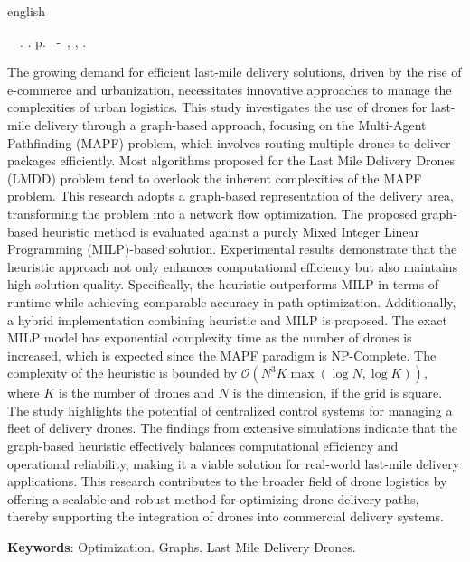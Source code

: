 \begin{resumo}[Abstract]
\begin{otherlanguage*}{english}
	\begin{flushleft} 
			\setlength{\absparsep}{0pt} %
			\SingleSpacing 
			\imprimirautorabr~~\textbf{\imprimirtituloresumo}.	\imprimirdata. \pageref{LastPage}p. 
			\imprimirtipotrabalho~-~\imprimirinstituicao, \imprimirlocal, \imprimirdata. 
 	\end{flushleft}
\OnehalfSpacing
	
The growing demand for efficient last-mile delivery solutions, driven by the rise of e-commerce and urbanization, necessitates innovative approaches to manage the complexities of urban logistics. This study investigates the use of drones for last-mile delivery through a graph-based approach, focusing on the Multi-Agent Pathfinding (MAPF) problem, which involves routing multiple drones to deliver packages efficiently. Most algorithms proposed for the Last Mile Delivery Drones (LMDD) problem tend to overlook the inherent complexities of the MAPF problem. This research adopts a graph-based representation of the delivery area, transforming the problem into a network flow optimization. The proposed graph-based heuristic method is evaluated against a purely Mixed Integer Linear Programming (MILP)-based solution. Experimental results demonstrate that the heuristic approach not only enhances computational efficiency but also maintains high solution quality. Specifically, the heuristic outperforms MILP in terms of runtime while achieving comparable accuracy in path optimization. Additionally, a hybrid implementation combining heuristic and MILP is proposed. The exact MILP model has exponential complexity time as the number of drones is increased, which is expected since the MAPF paradigm is NP-Complete. The complexity of the heuristic is bounded by \(\mathcal{O}(N^3 K \max{(\log N, \log K)})\), where $K$ is the number of drones and $N$ is the dimension, if the grid is square. The study highlights the potential of centralized control systems for managing a fleet of delivery drones. The findings from extensive simulations indicate that the graph-based heuristic effectively balances computational efficiency and operational reliability, making it a viable solution for real-world last-mile delivery applications. This research contributes to the broader field of drone logistics by offering a scalable and robust method for optimizing drone delivery paths, thereby supporting the integration of drones into commercial delivery systems.  


   \vspace{\onelineskip}
 
   \noindent 
   \textbf{Keywords}: Optimization. Graphs. Last Mile Delivery Drones.
 \end{otherlanguage*}
\end{resumo}
